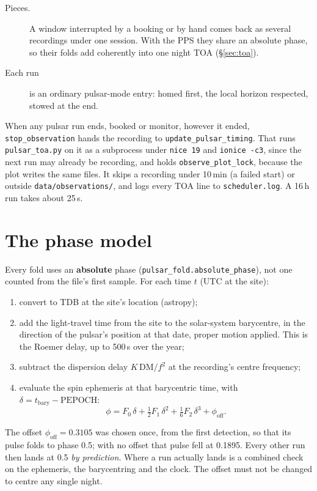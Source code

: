 \documentclass[11pt,a4paper]{article}
\newcommand{\code}[1]{\texttt{#1}}
\begin{document}
\begin{description}
\item[Pieces.] A window interrupted by a booking or by hand comes back as several recordings under one session. With the PPS they share an absolute phase, so their folds add coherently into one night TOA (\S\ref{sec:toa}).
\item[Each run] is an ordinary pulsar-mode entry: homed first, the local horizon respected, stowed at the end.
\end{description}

When any pulsar run ends, booked or monitor, however it ended, \code{stop\_observation} hands the recording to \code{update\_pulsar\_timing}. That runs \code{pulsar\_toa.py} on it as a subprocess under \code{nice 19} and \code{ionice -c3}, since the next run may already be recording, and holds \code{observe\_plot\_lock}, because the plot writes the same files. It skips a recording under 10\,min (a failed start) or outside \code{data/observations/}, and logs every TOA line to \code{scheduler.log}. A 16\,h run takes about 25\,s.

\section{The phase model}
\label{sec:phase}

Every fold uses an \textbf{absolute} phase (\code{pulsar\_fold.absolute\_phase}), not one counted from the file's first sample. For each time $t$ (UTC at the site):
\begin{enumerate}
\item convert to TDB at the site's location (astropy);
\item add the light-travel time from the site to the solar-system barycentre, in the direction of the pulsar's position at that date, proper motion applied. This is the Roemer delay, up to 500\,s over the year;
\item subtract the dispersion delay $K\,\mathrm{DM}/f^2$ at the recording's centre frequency;
\item evaluate the spin ephemeris at that barycentric time, with $\delta = t_\mathrm{bary} - \mathrm{PEPOCH}$:
\begin{equation}
\phi = F_0\,\delta + \tfrac12 F_1\,\delta^2 + \tfrac16 F_2\,\delta^3 + \phi_\mathrm{off}.
\end{equation}
\end{enumerate}

The offset $\phi_\mathrm{off} = 0.3105$ was chosen once, from the first detection, so that its pulse folds to phase 0.5; with no offset that pulse fell at 0.1895. Every other run then lands at 0.5 \emph{by prediction}. Where a run actually lands is a combined check on the ephemeris, the barycentring and the clock. The offset must not be changed to centre any single night.
\end{document}
